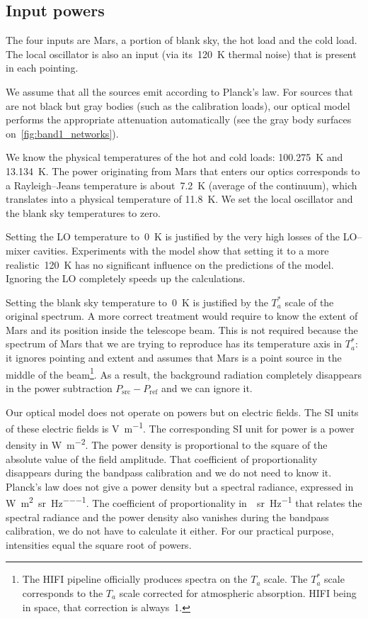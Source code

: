 
\subsection{Input powers}
The four inputs are Mars, a portion of blank sky, the hot load and the cold load.
The local oscillator is also an input (via its~\SI{120}{\kelvin} thermal noise) that is present in each pointing.

We assume that all the sources emit according to Planck's law.
For sources that are not black but gray bodies (such as the calibration loads), our optical model performs the appropriate attenuation automatically (see the gray body surfaces on~\cref{fig:band1_networks}).

We know the physical temperatures of the hot and cold loads:
\SI{100.275}{\kelvin} and \SI{13.134}{\kelvin}.
The power originating from Mars that enters our optics corresponds to a Rayleigh--Jeans temperature is about~\SI{7.2}{\kelvin} (average of the continuum), which translates into a physical temperature of \SI{11.8}{\kelvin}.
We set the local oscillator and the blank sky temperatures to zero.

Setting the LO temperature to~\SI{0}{\kelvin} is justified by the very high losses of the LO--mixer cavities.
Experiments with the model show that setting it to a more realistic~\SI{120}{\kelvin} has no significant influence on the predictions of the model.
Ignoring the LO completely speeds up the calculations.

Setting the blank sky temperature to~\SI{0}{\kelvin} is justified by the $T_a^*$ scale of the original spectrum.
A more correct treatment would require to know the extent of Mars and its position inside the telescope beam.
This is not required because the spectrum of Mars that we are trying to reproduce has its temperature axis in $T_a^*$: it ignores pointing and extent and assumes that Mars is a point source in the middle of the beam\footnote{
   The HIFI pipeline officially produces spectra on the $T_a$ scale.
   The $T_a^*$ scale corresponds to the $T_a$ scale corrected for atmospheric absorption.
   HIFI being in space, that correction is always~1.
}.
As a result, the background radiation completely disappears in the power subtraction $P_\text{src}-P_\text{ref}$ and we can ignore it.

Our optical model does not operate on powers but on electric fields.
The SI units of these electric fields is \si{\volt\per\meter}.
The corresponding SI unit for power is a power density in \si{\watt\per\meter\squared}.
The power density is proportional to the square of the absolute value of the field amplitude.
That coefficient of proportionality disappears during the bandpass calibration and we do not need to know it.
Planck's law does not give a power density but a spectral radiance, expressed in
\si{\watt\per\meter\squared\per\steradian\per\hertz}.
The coefficient of proportionality in~\si{\per\steradian\per\hertz} that relates the spectral radiance and the power density also vanishes during the bandpass calibration, we do not have to calculate it either.
For our practical purpose, intensities equal the square root of powers.

